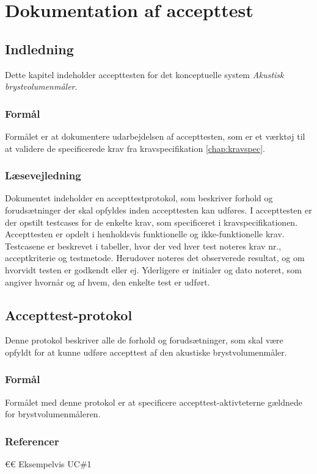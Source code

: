 
\chapter{Dokumentation af accepttest}
	\section{Indledning}
	Dette kapitel indeholder accepttesten for det konceptuelle system \textit{Akustisk brystvolumenmåler}.  
	 		  
	\subsection{Formål}
Formålet er at dokumentere udarbejdelsen af accepttesten, som er et værktøj til at validere de specificerede krav fra kravspecifikation \ref{chap:kravspec}. 
	
		\subsection{Læsevejledning}	
Dokumentet indeholder en accepttestprotokol, som beskriver forhold og forudsætninger der skal opfyldes inden accepttesten kan udføres. I accepttesten er der opstilt testcases for de enkelte krav, som specificeret i kravspecifikationen. Accepttesten er opdelt i henholdsvis funktionelle og ikke-funktionelle krav. Testcasene er beskrevet i tabeller, hvor der ved hver test noteres krav nr., acceptkriterie og testmetode. Herudover noteres det observerede resultat, og om hvorvidt testen er godkendt eller ej. Yderligere er initialer og dato noteret, som angiver hvornår og af hvem, den enkelte test er udført.
			
			
	\section{Accepttest-protokol}
	Denne protokol beskriver alle de forhold og forudsætninger, som skal være opfyldt for at kunne udføre accepttest af den akustiske brystvolumenmåler. 
	  
		\subsection{Formål}
		Formålet med denne protokol er at specificere accepttest-aktivteterne gældnede for brystvolumenmåleren. 
		
		\subsection{Referencer}
		€€ Eksempelvis UC\#1
		

